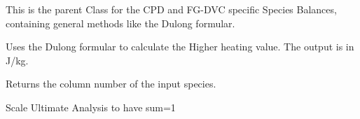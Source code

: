 \documentclass[letterpaper,10pt,english]{sphinxmanual}
\begin{document}
\begin{fulllineitems}
\label{CPDClasses:Compos_and_Energy.SpeciesBalance}
This is the parent Class for the CPD and FG-DVC specific Species Balances, containing general methods like the Dulong formular.

\begin{fulllineitems}
\label{CPDClasses:Compos_and_Energy.SpeciesBalance.Dulong}
Uses the Dulong formular to calculate the Higher heating value. The output is in J/kg.

\end{fulllineitems}


\begin{fulllineitems}
\label{CPDClasses:Compos_and_Energy.SpeciesBalance.SpeciesIndex}
Returns the column number of the input species.

\end{fulllineitems}


\begin{fulllineitems}
\label{CPDClasses:Compos_and_Energy.SpeciesBalance.correctUA}
Scale Ultimate Analysis to have sum=1

\end{fulllineitems}


\end{fulllineitems}

\end{document}
